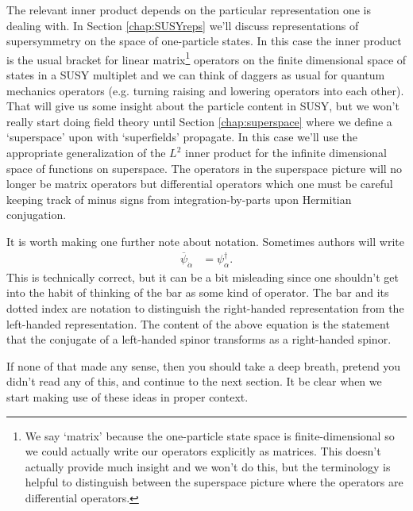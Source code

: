 \documentclass[12pt]{article}
\numberwithin{equation}{section}    %
\begin{document}
The relevant inner product depends on the particular representation one is dealing with. In Section \ref{chap:SUSYreps} we'll discuss representations of supersymmetry on the space of one-particle states. In this case the inner product is the usual bracket for linear matrix\footnote{We say `matrix' because the one-particle state space is finite-dimensional so we could actually write our operators explicitly as matrices. This doesn't actually provide much insight and we won't do this, but the terminology is helpful to distinguish between the superspace picture where the operators are differential operators.} operators on the finite dimensional space of states in a SUSY multiplet and we can think of daggers as usual for quantum mechanics operators (e.g. turning raising and lowering operators into each other). That will give us some insight about the particle content in SUSY, but we won't really start doing field theory until Section \ref{chap:superspace} where we define a `superspace' upon with `superfields' propagate. In this case we'll use the appropriate generalization of the $L^2$ inner product for the infinite dimensional space of functions on superspace. The operators in the superspace picture will no longer be matrix operators but differential operators which one must be careful keeping track of minus signs from integration-by-parts upon Hermitian conjugation.

It is worth making one further note about notation. Sometimes authors will write
\begin{align}
	\overline\psi_{\dot\alpha} &= \psi^\dag_\alpha.
\end{align}
This is technically correct, but it can be a bit misleading since one shouldn't get into the habit of thinking of the bar as some kind of operator. The bar and its dotted index are notation to distinguish the right-handed representation from the left-handed representation. The content of the above equation is the statement that the conjugate of a left-handed spinor transforms as a right-handed spinor.

If none of that made any sense, then you should take a deep breath, pretend you didn't read any of this, and continue to the next section. It be clear when we start making use of these ideas in proper context.
\end{document}
